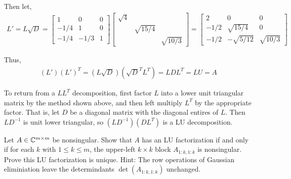 \documentclass[10pt]{article}
\begin{document}
\begin{solution}[Solution]
Then let,
\begin{align*}
    L' = L\sqrt{D} =
    \left[\begin{array}{rrr} 1 & 0 & 0 \\ -1/4 & 1 & 0 \\ -1/4 & -1/3 & 1  \end{array}\right]
    \left[\begin{array}{rrr} \sqrt{4} && \\ & \sqrt{15/4} &\\ & & \sqrt{10/3}\end{array}\right] = 
        \left[\begin{array}{rrr} 2 & 0 & 0 \\-1/2 & \sqrt{15/4} & 0 \\ -1/2 & -\sqrt{5/12} & \sqrt{10/3} \end{array}\right]
\end{align*}

Thus, 
\begin{align*}
    (L')(L')^T = (L\sqrt{D})(\sqrt{D}^TL^T) = L D L^T = L U = A 
\end{align*}

To return from a \( LL^T \) decomposition, first factor \( L \) into a lower unit triangular matrix by the method shown above, and then left multiply \( L^T \) by the appropriate factor. That is, let \( D \) be a diagonal matrix with the diagonal entires of \( L \). Then \( LD^{-1} \) is unit lower triangular, so \( (LD^{-1}) (DL^T) \) is a LU decomposition. 

\end{solution}


\begin{problem}[Exercise 20.1]
    Let \( A\in\mathbb{C}^{m\times  m} \) be nonsingular. Show that \( A \) has an LU factorization if and only if for each \( k \) with \( 1\leq k\leq m \), the upper-left \( k\times k \) block \( A_{1:k,1:k} \) is nonsingular. Prove this LU factorization is unique.
    Hint: The row operations of Gaussian eliminiation leave the determindants \( \det(A_{1:k,1:k}) \) unchanged.
\end{problem}
\end{document}
